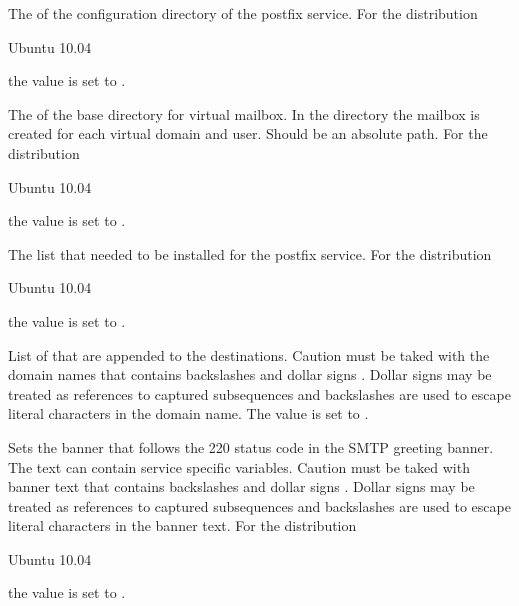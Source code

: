 The  of the configuration directory of the postfix service. 
For the distribution
\begin{inparaitem}
\item[\TheDistribution{ubuntu}] Ubuntu 10.04
\end{inparaitem}
the value is set to .


The  of the base directory for virtual mailbox.
In the directory the mailbox is created for each virtual domain and user.
Should be an absolute path.
For the distribution
\begin{inparaitem}
\item[\TheDistribution{ubuntu}] Ubuntu 10.04
\end{inparaitem}
the value is set to .


The  list that needed to be installed for the postfix service.
For the distribution
\begin{inparaitem}
\item[\TheDistribution{ubuntu}] Ubuntu 10.04
\end{inparaitem}
the value is set to .


List of  that are appended to the destinations.
Caution must be taked with the domain names that contains backslashes \qcode{\textbackslash} and 
dollar signs \qcode{\$}. Dollar signs may be treated as references to 
captured subsequences and backslashes are used to escape literal characters  in the domain name.
The value is set to .


Sets the banner  that follows the 220 status code in the SMTP 
greeting banner. The text can contain service specific variables. Caution
must be taked with banner text that contains backslashes \qcode{\textbackslash} and 
dollar signs \qcode{\$}. Dollar signs may be treated as references to 
captured subsequences and backslashes are used to escape literal characters 
in the banner text.
For the distribution
\begin{inparaitem}
\item[\TheDistribution{ubuntu}] Ubuntu 10.04
\end{inparaitem}
the value is set to .

